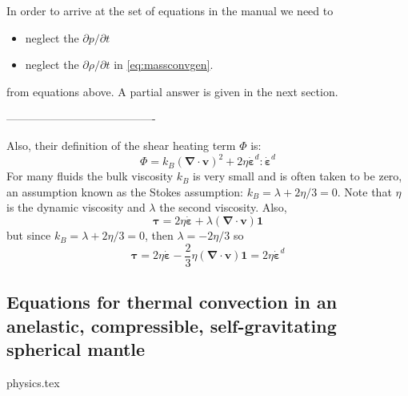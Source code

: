 In order to arrive at the set of equations in the \aspect manual
we need to 
\begin{itemize}
\item neglect the $\partial p/\partial t$  
\item neglect the $\partial \rho / \partial t$  in \eqref{eq:massconvgen}.
\end{itemize}
from equations above. A partial answer is given in the next section. 

----------------------------------------

Also, their definition of the shear heating term $\Phi$ is:
\[
\Phi = k_B ({\bm \nabla}\cdot{\bm v})^2 + 2\eta \dot{\bm \varepsilon}^d:\dot{\bm \varepsilon}^d
\]
For many fluids the bulk viscosity $k_B$ is very small and is often taken to be zero, an assumption known
as the Stokes assumption: $k_B=\lambda+2\eta/3=0$. 
Note that $\eta$ is the dynamic viscosity and $\lambda$ the second viscosity. 
Also, 
\[
{\bm \tau}=2\eta \dot{\bm \varepsilon} + \lambda ({\bm \nabla}\cdot{\bm v}) {\bm 1}
\]
but since $k_B=\lambda+2\eta/3=0$, then $\lambda=-2\eta/3$ so 
\[
{\bm \tau}=2\eta \dot{\bm \varepsilon} -\frac{2}{3}\eta ({\bm \nabla}\cdot{\bm v}) {\bm 1} = 2\eta \dot{\bm \varepsilon}^d
\]

\subsection{Equations for thermal convection in an anelastic, compressible, self-gravitating spherical mantle }
\begin{flushright} {\tiny {\color{gray} physics.tex}} \end{flushright}

